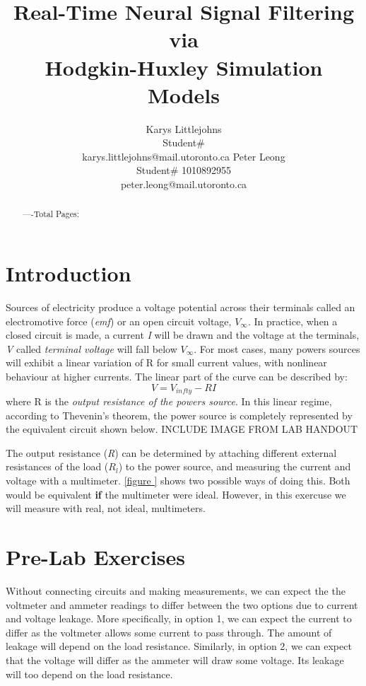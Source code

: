 \documentclass{article} %
\title{Real-Time Neural Signal Filtering via \\
Hodgkin-Huxley Simulation Models}
\author{Karys Littlejohns\\
Student\# \\
karys.littlejohns@mail.utoronto.ca
\And
Peter Leong \\
Student\# 1010892955 \\
peter.leong@mail.utoronto.ca \\
\AND
}
\begin{document}
\maketitle

\vspace{-6ex}

\begin{abstract}

----Total Pages: \pageref{last_page}
\end{abstract}

\vspace{2ex}

\begin{multicols}{2}

\section{Introduction}

Sources of electricity produce a voltage potential across their terminals called an electromotive force (\textit{emf}) or an open circuit voltage, $V_{\infty}$.
In practice, when a closed circuit is made, a current \textit{I} will be drawn and the voltage at the terminals, \textit{V} called \textit{terminal voltage} will fall below $V_{\infty}$.
For most cases, many powers sources will exhibit a linear variation of R for small current values, with nonlinear behaviour at higher currents.
The linear part of the curve can be described by:
\[
V = V_{infty} - RI
\]
where R is the \textit{output resistance of the powers source}.
In this linear regime, according to Thevenin's theorem, the power source is completely represented by the equivalent circuit shown below.
INCLUDE IMAGE FROM LAB HANDOUT

The output resistance (\textit{R}) can be determined by attaching different external resistances of the load ($R_{l}$) to the power source, and measuring the current and voltage with a multimeter.
\ref{figure } shows two possible ways of doing this. Both would be equivalent \textbf{if} the multimeter were ideal.
However, in this exercuse we will measure with real, not ideal, multimeters.

\section{Pre-Lab Exercises}

Without connecting circuits and making measurements, we can expect the the voltmeter and ammeter readings to differ between the two options due to current and voltage leakage.
More specifically, in option 1, we can expect the current to differ as the voltmeter allows some current to pass through. The amount of leakage will depend on the load resistance.
Similarly, in option 2, we can expect that the voltage will differ as the ammeter will draw some voltage. Its leakage will too depend on the load resistance.


\end{multicols}
\end{document}

